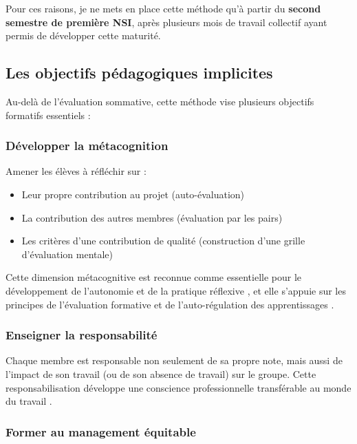 Pour ces raisons, je ne mets en place cette méthode qu'à partir du \textbf{second semestre de première NSI}, après plusieurs mois de travail collectif ayant permis de développer cette maturité.

\subsection{Les objectifs pédagogiques implicites}

Au-delà de l'évaluation sommative, cette méthode vise plusieurs objectifs formatifs essentiels \parencite{perrenoud_pratique_reflexive} :

\subsubsection{Développer la métacognition}

Amener les élèves à réfléchir sur :
\begin{itemize}[leftmargin=*]
    \item Leur propre contribution au projet (auto-évaluation)
    \item La contribution des autres membres (évaluation par les pairs) \parencite{evaluation_pairs_univ_poitiers}
    \item Les critères d'une contribution de qualité (construction d'une grille d'évaluation mentale)
\end{itemize}

Cette dimension métacognitive est reconnue comme essentielle pour le développement de l'autonomie et de la pratique réflexive \parencite{perrenoud_pratique_reflexive,schon_reflective_practitioner}, et elle s'appuie sur les principes de l'évaluation formative et de l'auto-régulation des apprentissages \parencite{nicol_formative_assessment,topping_peer_assessment}.

\subsubsection{Enseigner la responsabilité}

Chaque membre est responsable non seulement de sa propre note, mais aussi de l'impact de son travail (ou de son absence de travail) sur le groupe. Cette responsabilisation développe une conscience professionnelle transférable au monde du travail \parencite{competences_transversales}.

\subsubsection{Former au management équitable}


